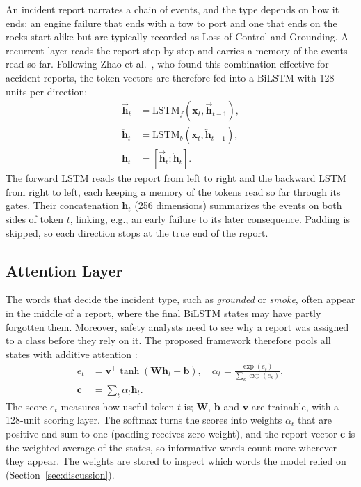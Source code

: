 \documentclass[conference]{IEEEtran}
\begin{document}
An incident report narrates a chain of events, and the type depends on how it ends: an engine failure that ends with a tow to port and one that ends on the rocks start alike but are typically recorded as Loss of Control and Grounding. A recurrent layer reads the report step by step and carries a memory of the events read so far. Following Zhao et al.\ \cite{zhao2025causation}, who found this combination effective for accident reports, the token vectors are therefore fed into a BiLSTM \cite{hochreiter1997lstm,schuster1997bidirectional} with 128 units per direction:
\begin{equation}
\begin{aligned}
  \overrightarrow{\mathbf{h}}_t &= \mathrm{LSTM}_{f}(\mathbf{x}_t, \overrightarrow{\mathbf{h}}_{t-1}), \\
  \overleftarrow{\mathbf{h}}_t &= \mathrm{LSTM}_{b}(\mathbf{x}_t, \overleftarrow{\mathbf{h}}_{t+1}), \\
  \mathbf{h}_t &= [\overrightarrow{\mathbf{h}}_t ; \overleftarrow{\mathbf{h}}_t].
\end{aligned}
\end{equation}
The forward LSTM reads the report from left to right and the backward LSTM from right to left, each keeping a memory of the tokens read so far through its gates. Their concatenation $\mathbf{h}_t$ (256 dimensions) summarizes the events on both sides of token $t$, linking, e.g., an early failure to its later consequence. Padding is skipped, so each direction stops at the true end of the report.

\subsection{Attention Layer}

The words that decide the incident type, such as \emph{grounded} or \emph{smoke}, often appear in the middle of a report, where the final BiLSTM states may have partly forgotten them. Moreover, safety analysts need to see why a report was assigned to a class before they rely on it. The proposed framework therefore pools all states with additive attention \cite{niu2021attention}:
\begin{equation}
\begin{aligned}
  e_t &= \mathbf{v}^\top \tanh(\mathbf{W}\mathbf{h}_t + \mathbf{b}), \quad
  \alpha_t = \frac{\exp(e_t)}{\sum_{k}\exp(e_k)}, \\
  \mathbf{c} &= \textstyle\sum_t \alpha_t \mathbf{h}_t.
\end{aligned}
\end{equation}
The score $e_t$ measures how useful token $t$ is; $\mathbf{W}$, $\mathbf{b}$ and $\mathbf{v}$ are trainable, with a 128-unit scoring layer. The softmax turns the scores into weights $\alpha_t$ that are positive and sum to one (padding receives zero weight), and the report vector $\mathbf{c}$ is the weighted average of the states, so informative words count more wherever they appear. The weights are stored to inspect which words the model relied on (Section~\ref{sec:discussion}).
\end{document}
